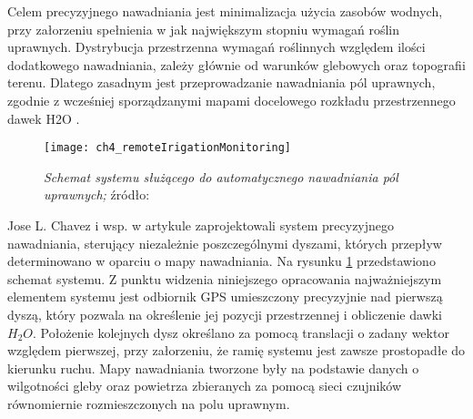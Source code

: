 Celem precyzyjnego nawadniania jest minimalizacja użycia zasobów wodnych, przy załorzeniu  spełnienia w jak największym stopniu wymagań roślin uprawnych.
Dystrybucja przestrzenna wymagań roślinnych względem ilości dodatkowego nawadniania, zależy głównie od warunków glebowych oraz topografii terenu.
Dlatego zasadnym jest przeprowadzanie nawadniania pól uprawnych, zgodnie z wcześniej sporządzanymi mapami docelowego rozkładu przestrzennego dawek H2O 
\cite{PA_RemoteIrrigation}.
\begin{figure}[H]
\centering
\texttt{[image: ch4\_remoteIrigationMonitoring]}
\caption{\textit{Schemat systemu służącego do automatycznego nawadniania pól uprawnych;} źródło: \cite[][strona 04]{PA_RemoteIrrigation}}
\label{fig:ch4_remoteIrigationMonitoring}
\end{figure}
Jose L. Chavez i wsp. w artykule \cite{PA_RemoteIrrigation} zaprojektowali system precyzyjnego nawadniania, sterujący niezależnie poszczególnymi dyszami,
których przepływ determinowano w oparciu o mapy nawadniania. Na rysunku \ref{fig:ch4_remoteIrigationMonitoring} przedstawiono schemat systemu.
Z punktu widzenia niniejszego opracowania najważniejszym elementem systemu jest odbiornik GPS umieszczony precyzyjnie nad pierwszą dyszą,
który pozwala na określenie jej pozycji przestrzennej i obliczenie dawki $H_{2}O$. Położenie kolejnych dysz określano za pomocą translacji
o zadany wektor względem pierwszej, przy załorzeniu, że ramię systemu jest zawsze prostopadłe do kierunku ruchu.
Mapy nawadniania tworzone były na podstawie danych o wilgotności gleby oraz powietrza zbieranych za pomocą sieci czujników
równomiernie rozmieszczonych na polu uprawnym. 

